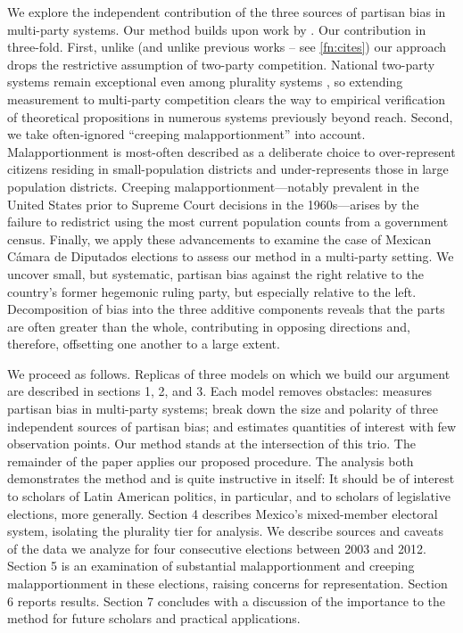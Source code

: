 \documentclass[letter,12pt]{article}
\begin{document}
We explore the independent contribution of the three sources of partisan bias in multi-party systems. Our method builds upon work by \citet{grofman.etalBiasMalapp.1997}. Our contribution in three-fold. First, unlike \citeauthor{grofman.etalBiasMalapp.1997} (and unlike previous works -- see \ref{fn:cites}) our approach drops the restrictive assumption of two-party competition. National two-party systems remain exceptional even among plurality systems \citep{cox.1997}, so extending measurement to multi-party competition clears the way to empirical verification of theoretical propositions in numerous systems previously beyond reach. Second, we take often-ignored ``creeping malapportionment'' \citep{johnston.2002} into account. Malapportionment is most-often described as a deliberate choice to over-represent citizens residing in small-population districts and under-represents those in large population districts. Creeping malapportionment---notably prevalent in the United States prior to Supreme Court decisions in the 1960s---arises by the failure to redistrict using the most current population counts from a government census. Finally, we apply these advancements to examine the case of Mexican C\'amara de Diputados elections to assess our method in a multi-party setting. We uncover small, but systematic, partisan bias against the right relative to the country's former hegemonic ruling party, but especially relative to the left. Decomposition of bias into the three additive components reveals that the parts are often greater than the whole, contributing in opposing directions and, therefore, offsetting one another to a large extent. 

We proceed as follows. Replicas of three models on which we build our argument are described in sections 1, 2, and 3. Each model removes obstacles: \citet{king.1990elRespBiasMultiparty} measures partisan bias in multi-party systems; \citet{grofman.etalBiasMalapp.1997} break down the size and polarity of three independent sources of partisan bias; and \citet{linzerSeatVoteElasticity2012} estimates quantities of interest with few observation points. Our method stands at the intersection of this trio. The remainder of the paper applies our proposed procedure. The analysis both demonstrates the method and is quite instructive in itself: It should be of interest to scholars of Latin American politics, in particular, and to scholars of legislative elections, more generally. Section 4 describes Mexico's mixed-member electoral system, isolating the plurality tier for analysis. We describe sources and caveats of the data we analyze for four consecutive elections between 2003 and 2012. Section 5 is an examination of substantial malapportionment and creeping malapportionment in these elections, raising concerns for representation. Section 6 reports results. Section 7 concludes with a discussion of the importance to the method for future scholars and practical applications. 
\end{document}
